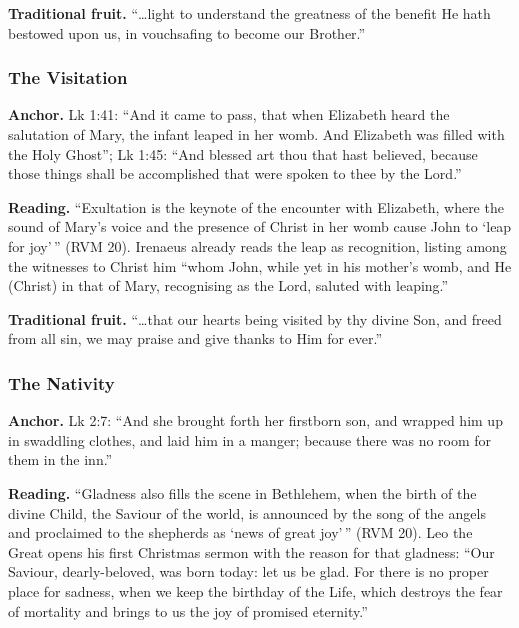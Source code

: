 \textbf{Traditional fruit.} ``\ldots light to understand the greatness
of the benefit He hath bestowed upon us, in vouchsafing to become our
Brother.''

\subsubsection{The Visitation}

\textbf{Anchor.} Lk 1:41: ``And it came to pass, that when Elizabeth
heard the salutation of Mary, the infant leaped in her womb. And
Elizabeth was filled with the Holy Ghost''; Lk 1:45: ``And blessed art
thou that hast believed, because those things shall be accomplished that
were spoken to thee by the Lord.''

\textbf{Reading.} ``Exultation is the keynote of the encounter with
Elizabeth, where the sound of Mary's voice and the presence of Christ in
her womb cause John to `leap for joy'\,'' (RVM 20). Irenaeus already
reads the leap as recognition, listing among the witnesses to Christ him
``whom John, while yet in his mother's womb, and He (Christ) in that of
Mary, recognising as the Lord, saluted with leaping.''

\textbf{Traditional fruit.} ``\ldots that our hearts being visited by
thy divine Son, and freed from all sin, we may praise and give thanks to
Him for ever.''

\subsubsection{The Nativity}

\textbf{Anchor.} Lk 2:7: ``And she brought forth her firstborn son, and
wrapped him up in swaddling clothes, and laid him in a manger; because
there was no room for them in the inn.''

\textbf{Reading.} ``Gladness also fills the scene in Bethlehem, when the
birth of the divine Child, the Saviour of the world, is announced by the
song of the angels and proclaimed to the shepherds as `news of great
joy'\,'' (RVM 20). Leo the Great opens his first Christmas sermon with
the reason for that gladness: ``Our Saviour, dearly-beloved, was born
today: let us be glad. For there is no proper place for sadness, when we
keep the birthday of the Life, which destroys the fear of mortality and
brings to us the joy of promised eternity.''

